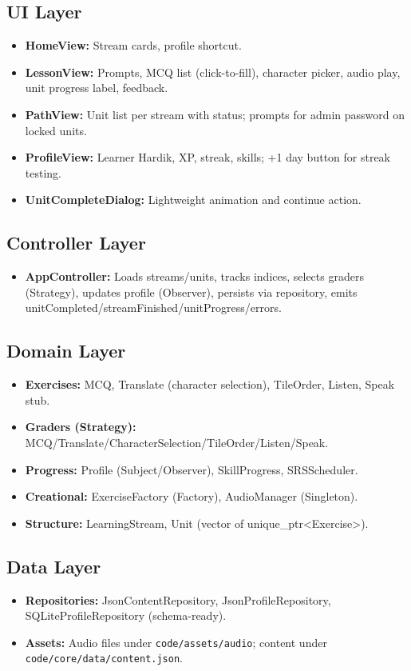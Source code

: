 \documentclass{article}
\begin{document}
\subsection{UI Layer}
\begin{itemize}
  \item \textbf{HomeView:} Stream cards, profile shortcut.
  \item \textbf{LessonView:} Prompts, MCQ list (click-to-fill), character picker, audio play, unit progress label, feedback.
  \item \textbf{PathView:} Unit list per stream with status; prompts for admin password on locked units.
  \item \textbf{ProfileView:} Learner Hardik, XP, streak, skills; +1 day button for streak testing.
  \item \textbf{UnitCompleteDialog:} Lightweight animation and continue action.
\end{itemize}
\subsection{Controller Layer}
\begin{itemize}
  \item \textbf{AppController:} Loads streams/units, tracks indices, selects graders (Strategy), updates profile (Observer), persists via repository, emits unitCompleted/streamFinished/unitProgress/errors.
\end{itemize}
\subsection{Domain Layer}
\begin{itemize}
  \item \textbf{Exercises:} MCQ, Translate (character selection), TileOrder, Listen, Speak stub.
  \item \textbf{Graders (Strategy):} MCQ/Translate/CharacterSelection/TileOrder/Listen/Speak.
  \item \textbf{Progress:} Profile (Subject/Observer), SkillProgress, SRSScheduler.
  \item \textbf{Creational:} ExerciseFactory (Factory), AudioManager (Singleton).
  \item \textbf{Structure:} LearningStream, Unit (vector of unique\_ptr<Exercise>).
\end{itemize}
\subsection{Data Layer}
\begin{itemize}
  \item \textbf{Repositories:} JsonContentRepository, JsonProfileRepository, SQLiteProfileRepository (schema-ready).
  \item \textbf{Assets:} Audio files under \texttt{code/assets/audio}; content under \texttt{code/core/data/content.json}.
\end{itemize}
\end{document}
